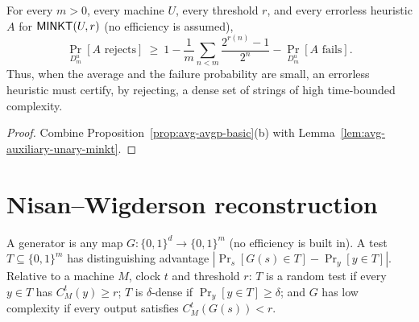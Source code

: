 \begin{theorem}
  \label{thm:avg-dense-extraction}
  \leanok
  For every $m > 0$, every machine $U$, every threshold $r$, and every errorless
  heuristic $A$ for $\mathsf{MINKT}(U, r)$ (no efficiency is assumed),
  \[
    \Pr_{D^u_m}[A \text{ rejects}] \ \ge\ 1 - \frac{1}{m}\sum_{n<m}
      \frac{2^{r(n)}-1}{2^n} - \Pr_{D^u_m}[A \text{ fails}].
  \]
  Thus, when the average and the failure probability are small, an errorless
  heuristic must certify, by rejecting, a dense set of strings of high
  time-bounded complexity.
\end{theorem}
\begin{proof}
  \leanok
  Combine Proposition~\ref{prop:avg-avgp-basic}(b) with
  Lemma~\ref{lem:avg-auxiliary-unary-minkt}.
\end{proof}

\section{Nisan--Wigderson reconstruction}

\begin{definition}
  \label{def:avg-bitgenerator}
  \leanok
  A generator is any map $G \colon \{0,1\}^d \to \{0,1\}^m$ (no efficiency is
  built in). A test $T \subseteq \{0,1\}^m$ has distinguishing advantage
  $|\Pr_s[G(s) \in T] - \Pr_y[y \in T]|$. Relative to a machine $M$, clock $t$
  and threshold $r$: $T$ is a random test if every $y \in T$ has $C^t_M(y) \ge
  r$; $T$ is $\delta$-dense if $\Pr_y[y \in T] \ge \delta$; and $G$ has low
  complexity if every output satisfies $C^t_M(G(s)) < r$.
\end{definition}

